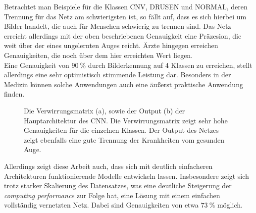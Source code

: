 %
Betrachtet man Beispiele für die Klassen CNV, DRUSEN und NORMAL, deren
Trennung für das Netz am schwierigsten ist, so fällt auf, dass es sich hierbei
um Bilder handelt, die auch für Menschen schwierig zu trennen sind. Das Netz
erreicht allerdings mit der oben beschriebenen Genauigkeit eine Präzesion, die
weit über der eines ungelernten Auges reicht. Ärzte hingegen erreichen
Genauigkeiten, die noch über dem hier erreichten Wert liegen.\\
Eine Genauigkeit von $\SI{90}{\percent}$ durch Bilderkennung auf 4 Klassen zu
erreichen, stellt allerdings eine sehr optimistisch stimmende Leistung dar.
Besonders in der Medizin können solche Anwendungen auch eine äußerst praktische
Anwendung finden.
\newpage
%
\begin{figure}[h!]
  \caption{Die Verwirrungsmatrix (a), sowie der Output (b) der Hauptarchitektur des CNN. Die Verwirrungsmatrix zeigt sehr hohe Genauigkeiten für die einzelnen Klassen. Der Output des Netzes zeigt ebenfalls eine gute Trennung der Krankheiten vom gesunden Auge.}
  \label{fig:erg}
\end{figure}
%
Allerdings zeigt diese Arbeit auch, dass sich mit deutlich einfacheren
Architekturen funktionierende Modelle entwickeln lassen. Insbesondere zeigt
sich trotz starker Skalierung des Datensatzes, was eine deutliche Steigerung
der \textit{computing performance} zur Folge hat, eine Lösung mit einem
einfachen vollständig vernetzten Netz. Dabei sind Genauigkeiten von etwa
$\SI{73}{\percent}$ möglich.
